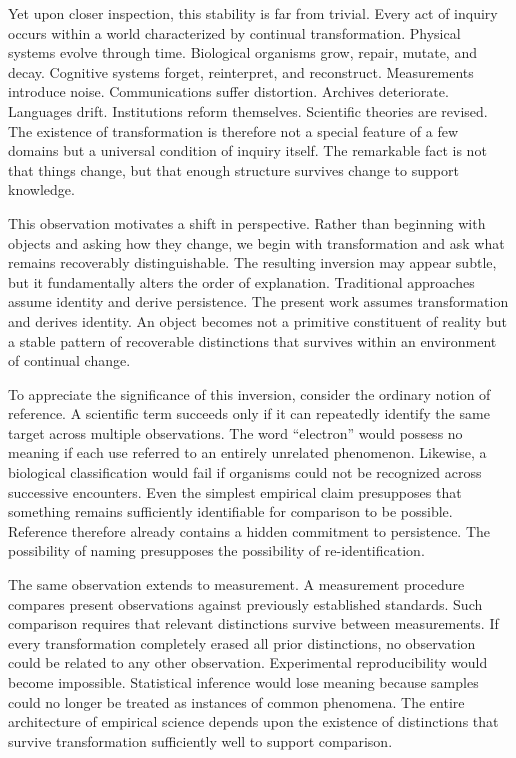 \documentclass[12pt,oneside]{article}
\theoremstyle{definition}
\begin{document}
Yet upon closer inspection, this stability is far from trivial. Every act of inquiry occurs within a world characterized by continual transformation. Physical systems evolve through time. Biological organisms grow, repair, mutate, and decay. Cognitive systems forget, reinterpret, and reconstruct. Measurements introduce noise. Communications suffer distortion. Archives deteriorate. Languages drift. Institutions reform themselves. Scientific theories are revised. The existence of transformation is therefore not a special feature of a few domains but a universal condition of inquiry itself. The remarkable fact is not that things change, but that enough structure survives change to support knowledge.

This observation motivates a shift in perspective. Rather than beginning with objects and asking how they change, we begin with transformation and ask what remains recoverably distinguishable. The resulting inversion may appear subtle, but it fundamentally alters the order of explanation. Traditional approaches assume identity and derive persistence. The present work assumes transformation and derives identity. An object becomes not a primitive constituent of reality but a stable pattern of recoverable distinctions that survives within an environment of continual change.

To appreciate the significance of this inversion, consider the ordinary notion of reference. A scientific term succeeds only if it can repeatedly identify the same target across multiple observations. The word ``electron'' would possess no meaning if each use referred to an entirely unrelated phenomenon. Likewise, a biological classification would fail if organisms could not be recognized across successive encounters. Even the simplest empirical claim presupposes that something remains sufficiently identifiable for comparison to be possible. Reference therefore already contains a hidden commitment to persistence. The possibility of naming presupposes the possibility of re-identification.

The same observation extends to measurement. A measurement procedure compares present observations against previously established standards. Such comparison requires that relevant distinctions survive between measurements. If every transformation completely erased all prior distinctions, no observation could be related to any other observation. Experimental reproducibility would become impossible. Statistical inference would lose meaning because samples could no longer be treated as instances of common phenomena. The entire architecture of empirical science depends upon the existence of distinctions that survive transformation sufficiently well to support comparison.
\end{document}
